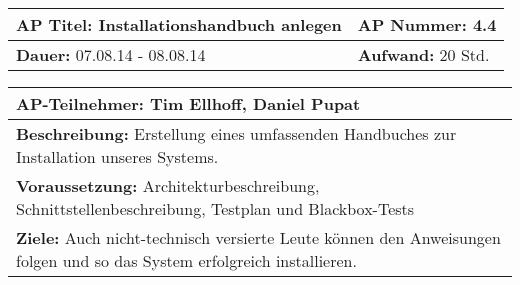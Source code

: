 \begin{tabular}{|p{7.43cm}|p{7.43cm}|}
\hline
\textbf{AP Titel: }Installationshandbuch anlegen & \textbf{AP Nummer: }4.4\\ 
\hline
\textbf{Dauer: }07.08.14 - 08.08.14& \textbf{Aufwand: } 20 Std.\\
\hline
\end{tabular}
\begin{tabular}{|p{15.3cm}|}
\hline
\textbf{AP-Teilnehmer: }Tim Ellhoff, Daniel Pupat\\
\hline
\textbf{Beschreibung: }Erstellung eines umfassenden Handbuches zur Installation unseres Systems.\\
\hline
\textbf{Voraussetzung: }Architekturbeschreibung, Schnittstellenbeschreibung, Testplan und Blackbox-Tests \\
\hline 
\textbf{Ziele: }Auch nicht-technisch versierte Leute können den Anweisungen folgen und so das System erfolgreich installieren.\\
\hline 
\end{tabular}


